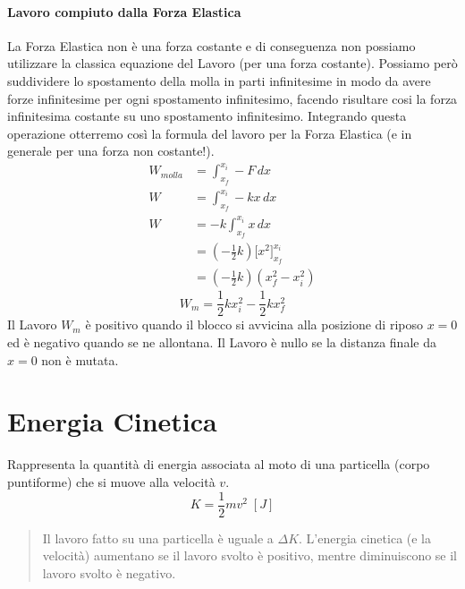         \paragraph{Lavoro compiuto dalla Forza Elastica} La Forza Elastica non 
        è una forza costante e di conseguenza non possiamo utilizzare la 
        classica equazione del Lavoro (per una forza costante). Possiamo però 
        suddividere lo spostamento della molla in parti infinitesime in modo da
        avere forze infinitesime per ogni spostamento infinitesimo, facendo 
        risultare cosi la forza infinitesima costante su uno spostamento 
        infinitesimo. Integrando questa operazione otterremo così la formula 
        del lavoro per la Forza Elastica 
        (e in generale per una forza non costante!).
        \begin{align*}
            W_{molla} &= \int_{x_f}^{x_i} -F \,dx \\
            W &= \int_{x_f}^{x_i} -kx \,dx \\
            W &= -k \int_{x_f}^{x_i} x \,dx \\
            &= (-\frac{1}{2}k)\bigg[x^2 \bigg]_{x_f}^{x_i} \\
            &= (-\frac{1}{2}k) (x^2_f - x^2_i)
        \end{align*}
        \begin{equation}
            W_m = \frac{1}{2}kx^2_i - \frac{1}{2}kx^2_f
        \end{equation}
        Il Lavoro $W_m$ è positivo quando il blocco si avvicina alla posizione 
        di riposo $x=0$ ed è negativo quando se ne allontana. Il Lavoro è nullo
        se la distanza finale da $x=0$ non è mutata.

    \section{Energia Cinetica} Rappresenta la quantità di energia associata al 
        moto di una particella (corpo puntiforme) che si muove alla velocità 
        $v$.
        \begin{equation}
            K = \frac{1}{2}mv^2 \; [J]
        \end{equation}

        \begin{quote}
            Il lavoro fatto su una particella è uguale a $\Delta K$. L'energia 
            cinetica (e la velocità) aumentano se il lavoro svolto è positivo, 
            mentre diminuiscono se il lavoro svolto è negativo.
        \end{quote}

